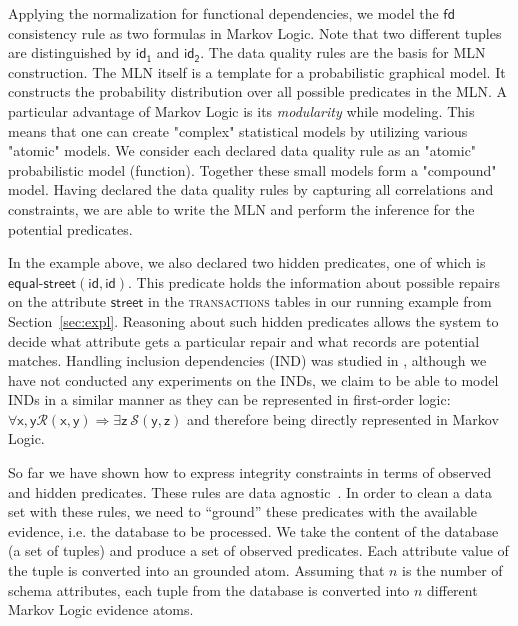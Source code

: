 Applying the normalization for functional dependencies, we model the $\mathsf{fd}$ consistency rule as two formulas in Markov Logic. 
Note that two different tuples are distinguished by $\mathsf{id_1}$ and $\mathsf{id_2}$. 
The data quality rules are the basis for MLN construction. The MLN itself is a template for a probabilistic graphical model. It constructs the probability distribution over all possible predicates in the MLN. A particular advantage of Markov Logic is its \textit{modularity} while modeling. This means that one can create "complex" statistical models by utilizing various "atomic" models. We consider each declared data quality rule as an "atomic" probabilistic model
(function). Together these small models form a "compound" model. Having declared the data quality rules by capturing all correlations and
constraints, we are able to write the MLN and perform the inference for the potential predicates. 

In the example above, we also declared two hidden predicates, one of which is $\mathsf{\textsf{equal-street}(id, id)}$. This predicate holds the information about possible repairs 
on the attribute $\mathsf{\textsf{street}}$ in the \textsc{transactions} tables in our running example from Section~\ref{sec:expl}.
Reasoning about such hidden predicates allows the system to decide what attribute gets a particular repair and what records are potential matches. 
Handling inclusion dependencies (IND)  was studied in \cite{bohannon2005cost}, although we have not conducted any experiments on the INDs, we claim to be able to model INDs in a similar manner as they can be represented in first-order logic: $\mathsf{\forall x, y\mathcal{R}(x, y) \Rightarrow \exists z~\mathcal{S}(y, z)} $ and therefore being directly represented in Markov Logic.

So far we have shown how to express integrity constraints in terms of observed and hidden predicates. These rules are data agnostic~\cite{fan2012foundations}. In order to clean a data set with these rules, we need to ``ground'' these predicates with the available evidence, i.e. the database to be processed. We take the content of the database (a set of tuples) and produce a set of observed predicates. Each attribute value of the tuple is converted into an grounded atom. Assuming that $n$ is the number of schema attributes, each tuple from the database is converted into $n$ different Markov Logic evidence atoms.

